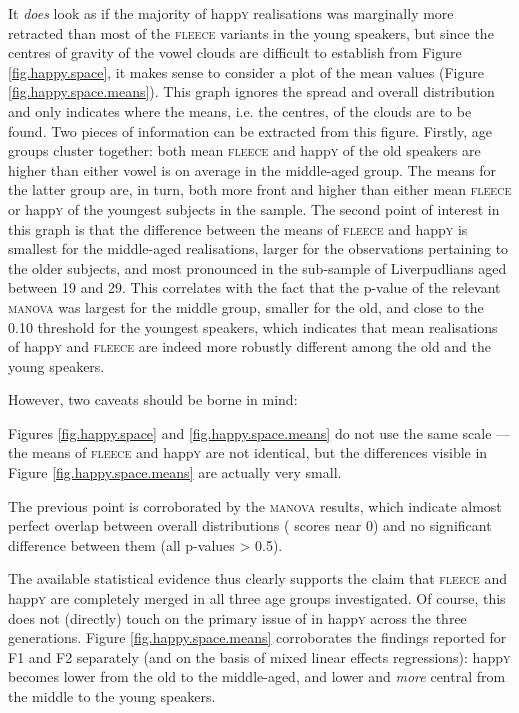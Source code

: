 It \emph{does} look as if the majority of happ\textsc{y} realisations was marginally more retracted than most of the \textsc{fleece} variants in the young speakers, but since the centres of gravity of the vowel clouds are difficult to establish from Figure \ref{fig.happy.space}, it makes sense to consider a plot of the mean values (Figure \ref{fig.happy.space.means}).
This graph ignores the spread and overall distribution and only indicates where the means, i.e. the centres, of the  clouds are to be found.
Two pieces of information can be extracted from this figure.
Firstly, age groups cluster together: both mean \textsc{fleece} and happ\textsc{y} of the old speakers are higher than either vowel is on average in the middle-aged group.
The means for the latter group are, in turn, both more front and higher than either mean \textsc{fleece} or happ\textsc{y} of the youngest subjects in the sample.
The second point of interest in this graph is that the difference between the means of \textsc{fleece} and happ\textsc{y} is smallest for the middle-aged realisations, larger for the observations pertaining to the older subjects, and most pronounced in the sub-sample of Liverpudlians aged between 19 and 29.
This correlates with the fact that the p-value of the relevant \textsc{manova} was largest for the middle group, smaller for the old, and close to the 0.10 threshold for the youngest speakers, which indicates that mean realisations of happ\textsc{y} and \textsc{fleece} are indeed more robustly different among the old and the young speakers.

However, two caveats should be borne in mind:
\begin{inparaenum}[(1)]
	\item Figures \ref{fig.happy.space} and \ref{fig.happy.space.means} do not use the same scale --- the means of \textsc{fleece} and happ\textsc{y} are not identical, but the differences visible in Figure \ref{fig.happy.space.means} are actually very small.
	\item The previous point is corroborated by the \textsc{manova} results, which indicate almost perfect overlap between overall distributions ( scores near 0) and no significant difference between them (all p-values > 0.5).
\end{inparaenum}
The available statistical evidence thus clearly supports the claim that \textsc{fleece} and happ\textsc{y} are completely merged in all three age groups investigated.
Of course, this does not (directly) touch on the primary issue of  in happ\textsc{y} across the three generations.
Figure \ref{fig.happy.space.means} corroborates the findings reported for F1 and F2 separately (and on the basis of mixed linear effects regressions): happ\textsc{y} becomes lower from the old to the middle-aged, and lower and \emph{more} central from the middle to the young speakers.


